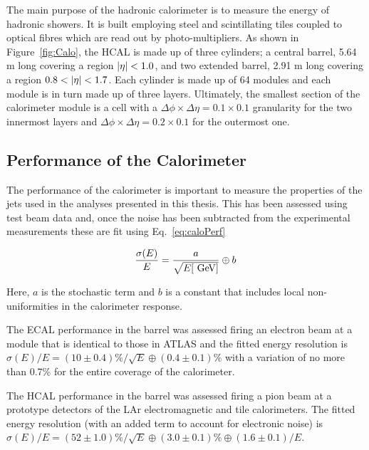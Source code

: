 				The main purpose of the hadronic calorimeter is to measure the energy of hadronic showers. It is built employing steel and scintillating tiles coupled to optical fibres which are read out by photo-multipliers. As shown in Figure~\ref{fig:Calo}, the \ac{HCAL} is made up of three cylinders; a central barrel, 5.64 m long covering a region $|\eta| < 1.0$, and two extended barrel, 2.91 m long covering a region $0.8 < |\eta| < 1.7$. Each cylinder is made up of 64 modules and each module is in turn made up of three layers. Ultimately, the smallest section of the calorimeter module is a cell with a $\Delta \phi \times \Delta \eta = 0.1 \times 0.1$ granularity for the two innermost layers and $\Delta \phi \times \Delta \eta = 0.2 \times 0.1$ for the outermost one. 

			\subsection*{Performance of the Calorimeter}

				The performance of the calorimeter is important to measure the properties of the jets used in the analyses presented in this thesis. This has been assessed using test beam data and, once the noise has been subtracted from the experimental measurements these are fit using Eq.~\ref{eq:caloPerf}

				\begin{equation}
				\label{eq:caloPerf}
					\frac{\sigma(E)}{E} = \frac{a}{\sqrt{E [ \GeV ] }} \oplus b
				\end{equation}

				\noindent Here, $a$ is the stochastic term and $b$ is a constant that includes local non-uniformities in the calorimeter response. 

				The \ac{ECAL} performance in the barrel was assessed firing an electron beam at a module that is identical to those in \ac{ATLAS} and the fitted energy resolution is $\sigma(E)/E = (10 \pm 0.4)\% / \sqrt{E} \oplus (0.4 \pm 0.1)\%$ with a variation of no more than 0.7\% for the entire coverage of the calorimeter.

				The \ac{HCAL} performance in the barrel was assessed firing a pion beam at a prototype detectors of the \ac{LAr} electromagnetic and tile calorimeters. The fitted energy resolution (with an added term to account for electronic noise) is $\sigma(E) / E = (52 \pm 1.0)\% / \sqrt{E} \oplus (3.0 \pm 0.1)\% \oplus (1.6 \pm 0.1) / E$. 


